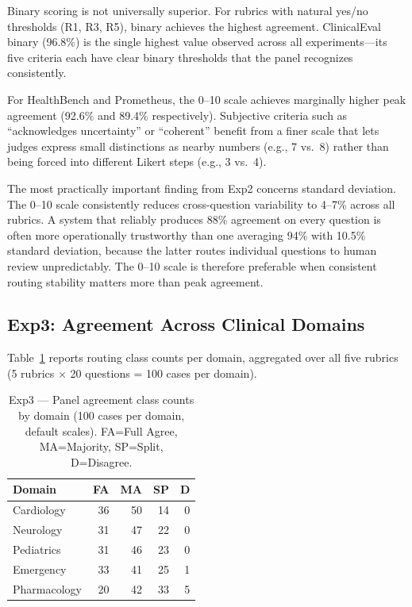 \documentclass[conference]{IEEEtran}
\begin{document}
Binary scoring is not universally superior. For rubrics with natural
yes/no thresholds (R1, R3, R5), binary achieves the highest agreement.
ClinicalEval binary (96.8\%) is the single highest value observed across
all experiments---its five criteria each have clear binary thresholds
that the panel recognizes consistently.

For HealthBench and Prometheus, the 0--10 scale achieves marginally
higher peak agreement (92.6\% and 89.4\% respectively). Subjective
criteria such as ``acknowledges uncertainty'' or ``coherent'' benefit
from a finer scale that lets judges express small distinctions as
nearby numbers (e.g., 7 vs.\ 8) rather than being forced into different
Likert steps (e.g., 3 vs.\ 4).

The most practically important finding from Exp2 concerns standard
deviation. The 0--10 scale consistently reduces cross-question
variability to 4--7\% across all rubrics. A system that reliably
produces 88\% agreement on every question is often more operationally
trustworthy than one averaging 94\% with 10.5\% standard deviation,
because the latter routes individual questions to human review
unpredictably. The 0--10 scale is therefore preferable when consistent
routing stability matters more than peak agreement.

\subsection{Exp3: Agreement Across Clinical Domains}

Table~\ref{tab:exp3} reports routing class counts per domain, aggregated
over all five rubrics (5 rubrics $\times$ 20 questions = 100 cases per domain).

\begin{table}[htbp]
\caption{Exp3 --- Panel agreement class counts by domain (100 cases per
domain, default scales). FA=Full Agree, MA=Majority, SP=Split, D=Disagree.}
\label{tab:exp3}
\begin{center}
\small
\begin{tabular}{|l|r|r|r|r|}
\hline
\textbf{Domain} & \textbf{FA} & \textbf{MA} & \textbf{SP} & \textbf{D} \\
\hline
Cardiology   & 36 & 50 & 14 & 0 \\
Neurology    & 31 & 47 & 22 & 0 \\
Pediatrics   & 31 & 46 & 23 & 0 \\
Emergency    & 33 & 41 & 25 & 1 \\
Pharmacology & 20 & 42 & 33 & 5 \\
\hline
\end{tabular}
\end{center}
\end{table}
\end{document}
